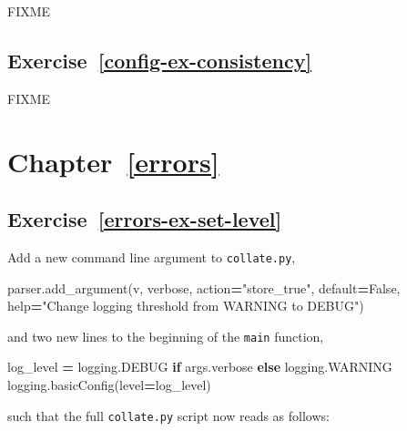 \documentclass[
]{krantz}
\makeatletter
\newenvironment{Shaded}{\begin{snugshade}}{\end{snugshade}}
\newcommand{\BuiltInTok}[1]{#1}
\newcommand{\ControlFlowTok}[1]{\textcolor[rgb]{0.13,0.29,0.53}{\textbf{#1}}}
\newcommand{\NormalTok}[1]{#1}
\newcommand{\OperatorTok}[1]{\textcolor[rgb]{0.81,0.36,0.00}{\textbf{#1}}}
\newcommand{\StringTok}[1]{\textcolor[rgb]{0.31,0.60,0.02}{#1}}
\newcommand{\VariableTok}[1]{\textcolor[rgb]{0.00,0.00,0.00}{#1}}
\newenvironment{kframe}{%
\medskip{}
\setlength{\fboxsep}{.8em}
 \def\at@end@of@kframe{}%
 \ifinner\ifhmode%
  \def\at@end@of@kframe{\end{minipage}}%
  \begin{minipage}{\columnwidth}%
 \fi\fi%
 \def\FrameCommand##1{\hskip\@totalleftmargin \hskip-\fboxsep
 \colorbox{shadecolor}{##1}\hskip-\fboxsep
     \hskip-\linewidth \hskip-\@totalleftmargin \hskip\columnwidth}%
 \MakeFramed {\advance\hsize-\width
   \@totalleftmargin\z@ \linewidth\hsize
   \@setminipage}}%
 {\par\unskip\endMakeFramed%
 \at@end@of@kframe}
\renewenvironment{Shaded}{\begin{kframe}}{\end{kframe}}
\makeatother
\begin{document}
FIXME

\hypertarget{exercise-refconfig-ex-consistency}{%
\subsection*{Exercise~\ref{config-ex-consistency}}\label{exercise-refconfig-ex-consistency}}


FIXME

\hypertarget{chapter-referrors}{%
\section*{Chapter~\ref{errors}}\label{chapter-referrors}}

\hypertarget{exercise-referrors-ex-set-level}{%
\subsection*{Exercise~\ref{errors-ex-set-level}}\label{exercise-referrors-ex-set-level}}


Add a new command line argument to \texttt{collate.py},

\begin{Shaded}
\begin{Highlighting}[]
\NormalTok{parser.add\_argument(}\StringTok{\textquotesingle{}{-}v\textquotesingle{}}\NormalTok{, }\StringTok{\textquotesingle{}{-}{-}verbose\textquotesingle{}}\NormalTok{, action}\OperatorTok{=}\StringTok{"store\_true"}\NormalTok{, default}\OperatorTok{=}\VariableTok{False}\NormalTok{,}
                    \BuiltInTok{help}\OperatorTok{=}\StringTok{"Change logging threshold from WARNING to DEBUG"}\NormalTok{)}
\end{Highlighting}
\end{Shaded}

and two new lines to the beginning of the \texttt{main} function,

\begin{Shaded}
\begin{Highlighting}[]
\NormalTok{log\_level }\OperatorTok{=}\NormalTok{ logging.DEBUG }\ControlFlowTok{if}\NormalTok{ args.verbose }\ControlFlowTok{else}\NormalTok{ logging.WARNING}
\NormalTok{logging.basicConfig(level}\OperatorTok{=}\NormalTok{log\_level)}
\end{Highlighting}
\end{Shaded}

such that the full \texttt{collate.py} script now reads as follows:
\end{document}
